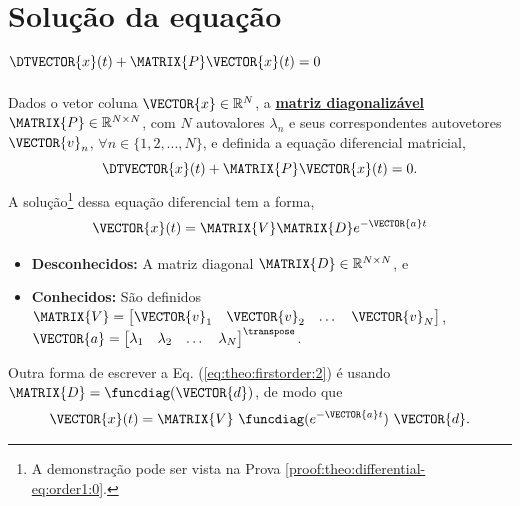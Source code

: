 \section{ Solução da equação $\DTVECTOR{x}(t) + \MATRIX{P} \VECTOR{x}(t)=0$ }

\begin{theorem}[Equação 
$\DTVECTOR{x}(t) + \MATRIX{P} \VECTOR{x}(t)=0$ com matriz $\MATRIX{P}$ diagonalizável:]
\label{theo:differential-eq:order1:0}
Dados o vetor coluna $\VECTOR{x} \in \mathbb{R}^N$, 
a \hyperref[def:diagonalization0]{\textbf{matriz diagonalizável}} $\MATRIX{P} \in \mathbb{R}^{N\times N}$,
com $N$ autovalores $\lambda_n$ e seus correspondentes autovetores $\VECTOR{v}_n$,
$\forall n \in \{1, 2, ..., N\}$, 
e definida a equação diferencial matricial,
\begin{equation}
\DTVECTOR{x}(t) + \MATRIX{P} \VECTOR{x}(t)=0.
\end{equation}
A solução\footnote{A
demonstração pode ser vista na Prova \ref{proof:theo:differential-eq:order1:0}.} dessa equação diferencial tem  a forma,
\begin{equation}\label{eq:theo:firstorder:2}
 \VECTOR{x}(t)= \MATRIX{V}\MATRIX{D} e^{-\VECTOR{a}t}
\end{equation}
\begin{itemize}
\item \textbf{Desconhecidos:} A matriz diagonal $\MATRIX{D} \in \mathbb{R}^{N \times N}$, e
\item  \textbf{Conhecidos:} São definidos $\MATRIX{V}=
\begin{bmatrix}
\VECTOR{v}_1 & \VECTOR{v}_2 & \dots & \VECTOR{v}_N
\end{bmatrix}$, 
$\VECTOR{a}=
\begin{bmatrix}
\lambda_1 & \lambda_2 & \dots & \lambda_N
\end{bmatrix}^{\transpose}$.
\end{itemize}
\end{theorem}

\begin{corollary}
\label{coro:differential-eq:order1:0}
Outra forma de escrever a Eq. (\ref{eq:theo:firstorder:2}) é usando $\MATRIX{D}=\funcdiag(\VECTOR{d})$, de modo que
\begin{equation}\label{eq:coro:firstorder:1}
 \VECTOR{x}(t)= \MATRIX{V}~\funcdiag(e^{-\VECTOR{a}t})~\VECTOR{d}.
\end{equation}
\end{corollary}

